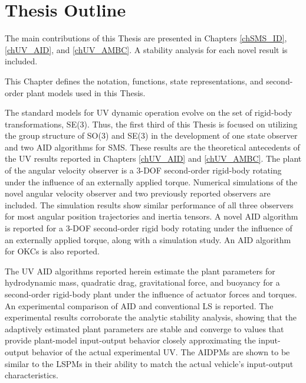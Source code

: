 \section{Thesis Outline}


The main contributions of this Thesis are presented in Chapters
\ref{chSMS_ID}, \ref{chUV_AID}, and \ref{chUV_AMBC}.
%
A stability analysis for each novel result is included.


 This Chapter defines the notation, functions,
state representations, and second-order plant models used in this
Thesis.


The standard models for \ac{UV} dynamic operation evolve on the set of
rigid-body transformations, SE(3).  Thus, the first third of this
Thesis is focused on utilizing the group structure of SO(3) and SE(3)
in the development of one state observer and two \ac{AID} algorithms
for \ac{SMS}.
%
These results are the theoretical antecedents of the \ac{UV} results
reported in Chapters \ref{chUV_AID} and \ref{chUV_AMBC}.
%
The plant of the angular velocity observer is a 3-\ac{DOF}
second-order rigid-body rotating under the influence of an externally
applied torque.
%
Numerical simulations of the novel angular velocity observer and two
previously reported observers are included.
%
The simulation results show similar performance of all three observers
for most angular position trajectories and inertia tensors.
%
A novel \ac{AID} algorithm is reported for a 3-\ac{DOF}
second-order rigid body rotating under the influence of an externally
applied torque, along with a simulation study.
%
An \ac{AID} algorithm for \acp{OKC} is also reported.


The \ac{UV} \ac{AID} algorithms reported herein estimate the plant
parameters for hydrodynamic mass, quadratic drag, gravitational force,
and buoyancy for a second-order rigid-body plant under the
influence of actuator forces and torques.
%
An experimental comparison of \ac{AID} and conventional
\ac{LS} %
is reported.
%
The experimental results corroborate the analytic stability analysis,
showing that the adaptively estimated plant parameters are stable and
converge to values that provide plant-model input-output behavior
closely approximating the input-output behavior of the actual
experimental \ac{UV}.
%
The \acp{AIDPM} are shown to be similar to the \acp{LSPM} in their
ability to match the actual vehicle's input-output characteristics.



